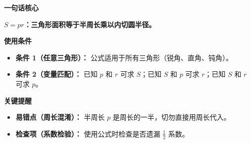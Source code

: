 \begin{summarybox}
	\textbf{\textcolor{CSummary}{一句话核心}}

	\textbf{$S = pr$：三角形面积等于半周长乘以内切圆半径。}

	\medskip
	\textbf{\textcolor{CSummary}{使用条件}}
	\begin{itemize}[leftmargin=*, itemsep=0.5em, topsep=0.4em]
		\item \textbf{条件 1（任意三角形）：} 公式适用于所有三角形（锐角、直角、钝角）。
		\item \textbf{条件 2（变量匹配）：} 已知 $p$ 和 $r$ 可求 $S$；已知 $S$ 和 $p$ 可求 $r$；已知 $S$ 和 $r$ 可求 $p$。
	\end{itemize}

	\medskip
	\textbf{\textcolor{CSummary}{关键提醒}}
	\begin{itemize}[leftmargin=*, itemsep=0.5em, topsep=0.4em]
		\item \textbf{易错点（周长混淆）：} 半周长 $p$ 是周长的一半，切勿直接用周长代入。
		\item \textbf{检查项（系数检验）：} 使用公式时检查是否遗漏 $\frac12$ 系数。
	\end{itemize}
\end{summarybox}
